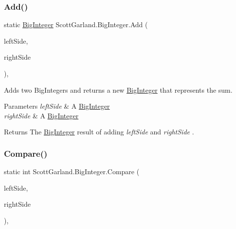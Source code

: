 \subsubsection{\texorpdfstring{Add()}{Add()}}
{\footnotesize\ttfamily static \hyperlink{class_scott_garland_1_1_big_integer}{Big\+Integer} Scott\+Garland.\+Big\+Integer.\+Add (\begin{DoxyParamCaption}\item[{\hyperlink{class_scott_garland_1_1_big_integer}{Big\+Integer}}]{left\+Side,  }\item[{\hyperlink{class_scott_garland_1_1_big_integer}{Big\+Integer}}]{right\+Side }\end{DoxyParamCaption})\hspace{0.3cm}{\ttfamily [inline]}, {\ttfamily [static]}}



Adds two Big\+Integers and returns a new \hyperlink{class_scott_garland_1_1_big_integer}{Big\+Integer} that represents the sum. 


\begin{DoxyParams}{Parameters}
{\em left\+Side} & A \hyperlink{class_scott_garland_1_1_big_integer}{Big\+Integer}\\
\hline
{\em right\+Side} & A \hyperlink{class_scott_garland_1_1_big_integer}{Big\+Integer}\\
\hline
\end{DoxyParams}
\begin{DoxyReturn}{Returns}
The \hyperlink{class_scott_garland_1_1_big_integer}{Big\+Integer} result of adding {\itshape left\+Side}  and {\itshape right\+Side} .
\end{DoxyReturn}
\mbox{\label{class_scott_garland_1_1_big_integer_a3724ad4d98940f216c8abce7834d5bf4}} 
\subsubsection{\texorpdfstring{Compare()}{Compare()}}
{\footnotesize\ttfamily static int Scott\+Garland.\+Big\+Integer.\+Compare (\begin{DoxyParamCaption}\item[{\hyperlink{class_scott_garland_1_1_big_integer}{Big\+Integer}}]{left\+Side,  }\item[{\hyperlink{class_scott_garland_1_1_big_integer}{Big\+Integer}}]{right\+Side }\end{DoxyParamCaption})\hspace{0.3cm}{\ttfamily [inline]}, {\ttfamily [static]}}



